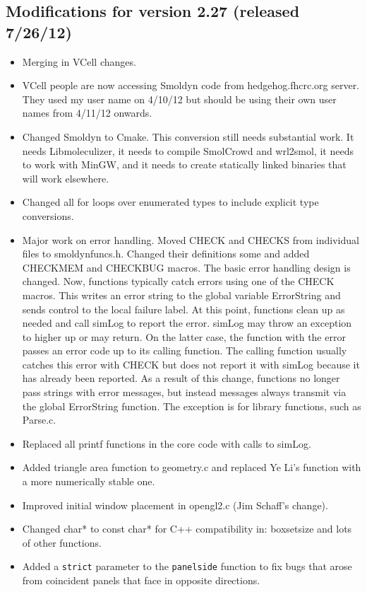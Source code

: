 \documentclass {scrbook}
\newcommand {\ttt} {\texttt}
\begin{document}
\subsection{Modifications for version 2.27 (released 7/26/12)}
\begin{itemize}
\item Merging in VCell changes.
\item VCell people are now accessing Smoldyn code from hedgehog.fhcrc.org server. They used my user name on 4/10/12 but should be using their own user names from 4/11/12 onwards.
\item Changed Smoldyn to Cmake. This conversion still needs substantial work. It needs Libmoleculizer, it needs to compile SmolCrowd and wrl2smol, it needs to work with MinGW, and it needs to create statically linked binaries that will work elsewhere.
\item Changed all for loops over enumerated types to include explicit type conversions.
\item Major work on error handling. Moved CHECK and CHECKS from individual files to smoldynfuncs.h. Changed their definitions some and added CHECKMEM and CHECKBUG macros. The basic error handling design is changed. Now, functions typically catch errors using one of the CHECK macros. This writes an error string to the global variable ErrorString and sends control to the local failure label. At this point, functions clean up as needed and call simLog to report the error. simLog may throw an exception to higher up or may return. On the latter case, the function with the error passes an error code up to its calling function. The calling function usually catches this error with CHECK but does not report it with simLog because it has already been reported. As a result of this change, functions no longer pass strings with error messages, but instead messages always transmit via the global ErrorString function. The exception is for library functions, such as Parse.c.
\item Replaced all printf functions in the core code with calls to simLog.
\item Added triangle area function to geometry.c and replaced Ye Li's function with a more numerically stable one.
\item Improved initial window placement in opengl2.c (Jim Schaff's change).
\item Changed char* to const char* for C++ compatibility in: boxsetsize and lots of other functions.
\item Added a \ttt{strict} parameter to the \ttt{panelside} function to fix bugs that arose from coincident panels that face in opposite directions.

\end{itemize}
\end{document}
